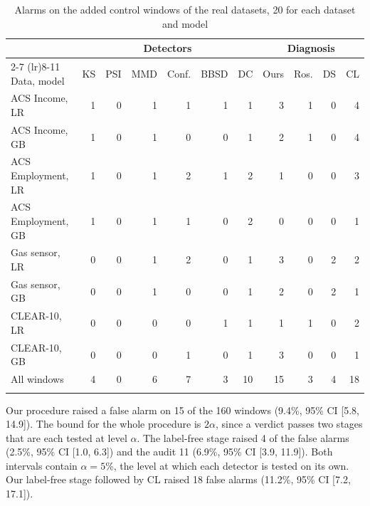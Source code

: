 \documentclass[pdflatex,sn-basic]{sn-jnl}
\begin{document}
\begin{table}[!htbp]\centering\tablebodyfont
\caption{Alarms on the added control windows of the real datasets, 20 for each dataset and model}\label{tab:controls}%
\begin{tabular}{@{}lrrrrrrrrrr@{}}
\toprule
 & \multicolumn{6}{c}{Detectors} & \multicolumn{4}{c}{Diagnosis} \\
\cmidrule(lr){2-7}
\cmidrule(lr){8-11}
Data, model & \multicolumn{1}{c}{KS} & \multicolumn{1}{c}{PSI} & \multicolumn{1}{c}{MMD} & \multicolumn{1}{c}{Conf.} & \multicolumn{1}{c}{BBSD} & \multicolumn{1}{c}{DC} & \multicolumn{1}{c}{Ours} & \multicolumn{1}{c}{Ros.} & \multicolumn{1}{c}{DS} & \multicolumn{1}{c}{CL} \\
\midrule
ACS Income, LR & 1 & 0 & 1 & 1 & 1 & 1 & 3 & 1 & 0 & 4 \\
ACS Income, GB & 1 & 0 & 1 & 0 & 0 & 1 & 2 & 1 & 0 & 4 \\
ACS Employment, LR & 1 & 0 & 1 & 2 & 1 & 2 & 1 & 0 & 0 & 3 \\
ACS Employment, GB & 1 & 0 & 1 & 1 & 0 & 2 & 0 & 0 & 0 & 1 \\
Gas sensor, LR & 0 & 0 & 1 & 2 & 0 & 1 & 3 & 0 & 2 & 2 \\
Gas sensor, GB & 0 & 0 & 1 & 0 & 0 & 1 & 2 & 0 & 2 & 1 \\
CLEAR-10, LR & 0 & 0 & 0 & 0 & 1 & 1 & 1 & 1 & 0 & 2 \\
CLEAR-10, GB & 0 & 0 & 0 & 1 & 0 & 1 & 3 & 0 & 0 & 1 \\
\midrule
All windows & 4 & 0 & 6 & 7 & 3 & 10 & 15 & 3 & 4 & 18 \\
\botrule
\end{tabular}
\end{table}

Our procedure raised a false alarm on 15 of the 160 windows (9.4\%, 95\% CI [5.8, 14.9]). The bound for the whole procedure is $2\alpha$, since a verdict passes two stages that are each tested at level $\alpha$. The label-free stage raised 4 of the false alarms (2.5\%, 95\% CI [1.0, 6.3]) and the audit 11 (6.9\%, 95\% CI [3.9, 11.9]). Both intervals contain $\alpha=5$\%, the level at which each detector is tested on its own. Our label-free stage followed by CL raised 18 false alarms (11.2\%, 95\% CI [7.2, 17.1]).

\FloatBarrier


\end{document}
